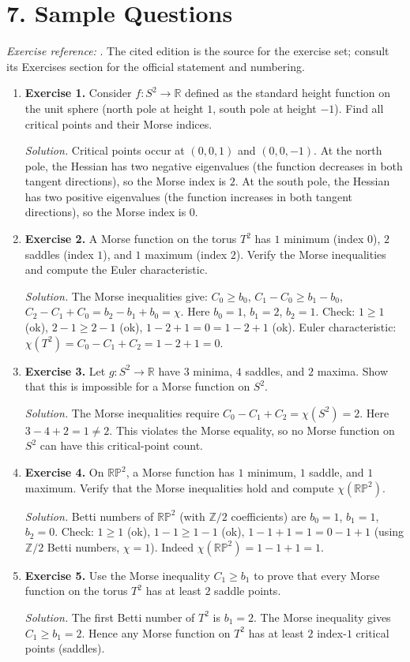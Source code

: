 \section*{7. Sample Questions}
\emph{Exercise reference:} \cite{morse_theory_ref1}. The cited edition is the source for the exercise set; consult its Exercises section for the official statement and numbering.
\begin{enumerate}[leftmargin=*,itemsep=0.9em]
\item \textbf{Exercise 1.} Consider $f\colon S^2\to\mathbb{R}$ defined as the standard height function on the unit sphere (north pole at height $1$, south pole at height $-1$). Find all critical points and their Morse indices.

\emph{Solution.} Critical points occur at $(0,0,1)$ and $(0,0,-1)$. At the north pole, the Hessian has two negative eigenvalues (the function decreases in both tangent directions), so the Morse index is $2$. At the south pole, the Hessian has two positive eigenvalues (the function increases in both tangent directions), so the Morse index is $0$.

\item \textbf{Exercise 2.} A Morse function on the torus $T^2$ has $1$ minimum (index $0$), $2$ saddles (index $1$), and $1$ maximum (index $2$). Verify the Morse inequalities and compute the Euler characteristic.

\emph{Solution.} The Morse inequalities give: $C_0\geq b_0$, $C_1-C_0\geq b_1-b_0$, $C_2-C_1+C_0=b_2-b_1+b_0=\chi$. Here $b_0=1$, $b_1=2$, $b_2=1$. Check: $1\geq 1$ (ok), $2-1\geq 2-1$ (ok), $1-2+1=0=1-2+1$ (ok). Euler characteristic: $\chi(T^2)=C_0-C_1+C_2=1-2+1=0$.

\item \textbf{Exercise 3.} Let $g\colon S^2\to\mathbb{R}$ have $3$ minima, $4$ saddles, and $2$ maxima. Show that this is impossible for a Morse function on $S^2$.

\emph{Solution.} The Morse inequalities require $C_0-C_1+C_2=\chi(S^2)=2$. Here $3-4+2=1\neq 2$. This violates the Morse equality, so no Morse function on $S^2$ can have this critical-point count.

\item \textbf{Exercise 4.} On $\mathbb{RP}^2$, a Morse function has $1$ minimum, $1$ saddle, and $1$ maximum. Verify that the Morse inequalities hold and compute $\chi(\mathbb{RP}^2)$.

\emph{Solution.} Betti numbers of $\mathbb{RP}^2$ (with $\mathbb{Z}/2$ coefficients) are $b_0=1$, $b_1=1$, $b_2=0$. Check: $1\geq 1$ (ok), $1-1\geq 1-1$ (ok), $1-1+1=1=0-1+1$ (using $\mathbb{Z}/2$ Betti numbers, $\chi=1$). Indeed $\chi(\mathbb{RP}^2)=1-1+1=1$.

\item \textbf{Exercise 5.} Use the Morse inequality $C_1\geq b_1$ to prove that every Morse function on the torus $T^2$ has at least $2$ saddle points.

\emph{Solution.} The first Betti number of $T^2$ is $b_1=2$. The Morse inequality gives $C_1\geq b_1=2$. Hence any Morse function on $T^2$ has at least $2$ index-$1$ critical points (saddles).

\end{enumerate}
